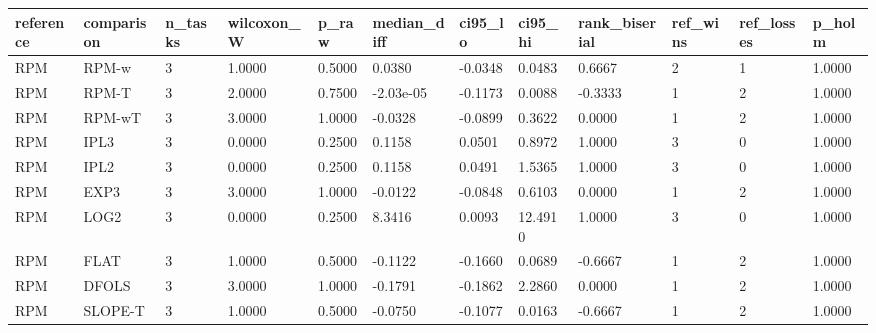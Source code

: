 \begin{tabular}{llllllllllll}
\hline
reference & comparison & n\_tasks & wilcoxon\_W & p\_raw & median\_diff & ci95\_lo & ci95\_hi & rank\_biserial & ref\_wins & ref\_losses & p\_holm \\
\hline
RPM & RPM-w & 3 & 1.0000 & 0.5000 & 0.0380 & -0.0348 & 0.0483 & 0.6667 & 2 & 1 & 1.0000 \\
RPM & RPM-T & 3 & 2.0000 & 0.7500 & -2.03e-05 & -0.1173 & 0.0088 & -0.3333 & 1 & 2 & 1.0000 \\
RPM & RPM-wT & 3 & 3.0000 & 1.0000 & -0.0328 & -0.0899 & 0.3622 & 0.0000 & 1 & 2 & 1.0000 \\
RPM & IPL3 & 3 & 0.0000 & 0.2500 & 0.1158 & 0.0501 & 0.8972 & 1.0000 & 3 & 0 & 1.0000 \\
RPM & IPL2 & 3 & 0.0000 & 0.2500 & 0.1158 & 0.0491 & 1.5365 & 1.0000 & 3 & 0 & 1.0000 \\
RPM & EXP3 & 3 & 3.0000 & 1.0000 & -0.0122 & -0.0848 & 0.6103 & 0.0000 & 1 & 2 & 1.0000 \\
RPM & LOG2 & 3 & 0.0000 & 0.2500 & 8.3416 & 0.0093 & 12.4910 & 1.0000 & 3 & 0 & 1.0000 \\
RPM & FLAT & 3 & 1.0000 & 0.5000 & -0.1122 & -0.1660 & 0.0689 & -0.6667 & 1 & 2 & 1.0000 \\
RPM & DFOLS & 3 & 3.0000 & 1.0000 & -0.1791 & -0.1862 & 2.2860 & 0.0000 & 1 & 2 & 1.0000 \\
RPM & SLOPE-T & 3 & 1.0000 & 0.5000 & -0.0750 & -0.1077 & 0.0163 & -0.6667 & 1 & 2 & 1.0000 \\
\hline
\end{tabular}
